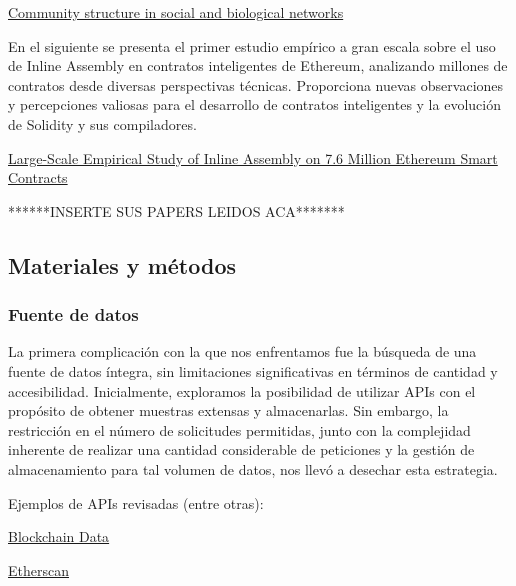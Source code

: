 \documentclass{article}
\begin{document}
\href{https://www.ncbi.nlm.nih.gov/pmc/articles/PMC122977/pdf/pq1202007821.pdf}{Community structure in social and
biological networks}
\newline

En el siguiente se presenta el primer estudio empírico a gran escala sobre el uso de Inline Assembly en contratos inteligentes de Ethereum, analizando millones de contratos desde diversas perspectivas técnicas. Proporciona nuevas observaciones y percepciones valiosas para el desarrollo de contratos inteligentes y la evolución de Solidity y sus compiladores.

\href{https://drive.google.com/file/d/111l8_vf7Gt7RxygjuBM8WQWLTQL700jY/view}{Large-Scale Empirical Study of Inline Assembly on 7.6 Million Ethereum Smart Contracts}
\newline

******INSERTE SUS PAPERS LEIDOS ACA*******

\subsection{Materiales y métodos}
\subsubsection{Fuente de datos}

La primera complicación con la que nos enfrentamos fue la búsqueda de una fuente de datos íntegra, sin limitaciones significativas en términos de cantidad y accesibilidad. Inicialmente, exploramos la posibilidad de utilizar APIs con el propósito de obtener muestras extensas y almacenarlas. Sin embargo, la restricción en el número de solicitudes permitidas, junto con la complejidad inherente de realizar una cantidad considerable de peticiones y la gestión de almacenamiento para tal volumen de datos, nos llevó a desechar esta estrategia.

Ejemplos de APIs revisadas (entre otras):
\begin{list}{}{\leftmargin=4em}
    \item \href{https://www.blockchain.com/explorer/api/blockchain_api}{Blockchain Data} 
    \item \href{https://etherscan.io/apis}{Etherscan}
\end{list}
\end{document}
